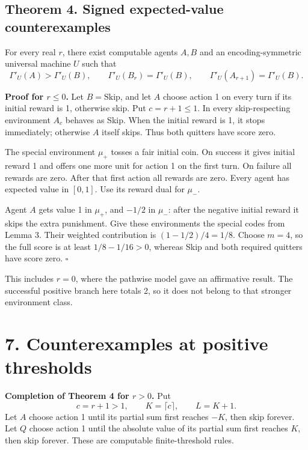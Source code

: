\documentclass[
  11pt,
  letterpaper,
]{article}
\begin{document}
\subsection{Theorem 4. Signed expected-value
counterexamples}\label{theorem-4.-signed-expected-value-counterexamples}

For every real \(r\), there exist computable agents \(A,B\) and an
encoding-symmetric universal machine \(U\) such that \[
 \Gamma'_U(A)>\Gamma'_U(B),\qquad
 \Gamma'_U(B_r)=\Gamma'_U(B),\qquad
 \Gamma'_U(A_{r+1})=\Gamma'_U(B).
\]

\textbf{Proof for \(r\leq0\).} Let \(B=\mathrm{Skip}\), and let \(A\)
choose action 1 on every turn if its initial reward is 1, otherwise
skip. Put \(c=r+1\leq1\). In every skip-respecting environment \(A_c\)
behaves as Skip. When the initial reward is 1, it stops immediately;
otherwise \(A\) itself skips. Thus both quitters have score zero.

The special environment \(\mu_+\) tosses a fair initial coin. On success
it gives initial reward 1 and offers one more unit for action 1 on the
first turn. On failure all rewards are zero. After that first action all
rewards are zero. Every agent has expected value in \([0,1]\). Use its
reward dual for \(\mu_-\).

Agent \(A\) gets value 1 in \(\mu_+\), and \(-1/2\) in \(\mu_-\): after
the negative initial reward it skips the extra punishment. Give these
environments the special codes from Lemma 3. Their weighted contribution
is \((1-1/2)/4=1/8\). Choose \(m=4\), so the full score is at least
\(1/8-1/16>0\), whereas Skip and both required quitters have score zero.
\hfill\(\square\)

This includes \(r=0\), where the pathwise model gave an affirmative
result. The successful positive branch here totals 2, so it does not
belong to that stronger environment class.

\section{7. Counterexamples at positive
thresholds}\label{counterexamples-at-positive-thresholds}

\textbf{Completion of Theorem 4 for \(r>0\).} Put \[
                  c=r+1>1,\qquad K=\lceil c\rceil,\qquad L=K+1.
\] Let \(A\) choose action 1 until its partial sum first reaches \(-K\),
then skip forever. Let \(Q\) choose action 1 until the absolute value of
its partial sum first reaches \(K\), then skip forever. These are
computable finite-threshold rules.
\end{document}
